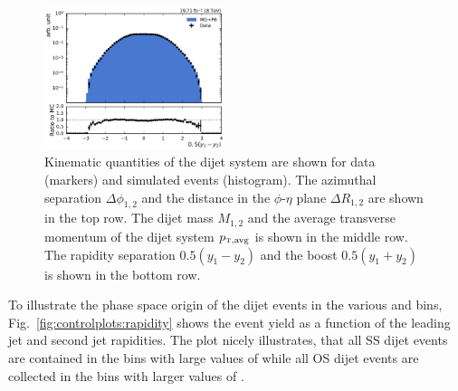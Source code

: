 \begin{figure}[htbp]
    \includegraphics[width=0.47\textwidth]{figures/measurement/dijet_quantities_dijet_ystar.pdf}
    \caption[Kinematic quantities of the dijet system]{Kinematic quantities of
    the dijet system are shown for data (markers) and simulated events
    (histogram). The
    azimuthal separation $\Delta\phi_{1,2}$ and the distance in the $\phi$-$\eta$ plane
    $\Delta R_{1,2}$ are shown in the top row. The dijet mass $M_{1,2}$ and the average
    transverse momentum of the dijet system $\ptavg$ is shown in the middle row. The
    rapidity separation $0.5(y_1 - y_2)$ and the boost $0.5(y_1+y_2)$ is shown in
    the bottom row.}
    \label{fig:controlplots:dijets}
\end{figure}

To illustrate the phase space origin of the dijet events in the various \ystar
and \yboost bins, Fig.~\ref{fig:controlplots:rapidity} shows the event yield as
a function of the leading jet and second jet rapidities. The plot nicely
illustrates, that all SS dijet events are contained in the bins with
large values of \yboost while all OS dijet events are collected in the bins with
larger values of \ystar.

